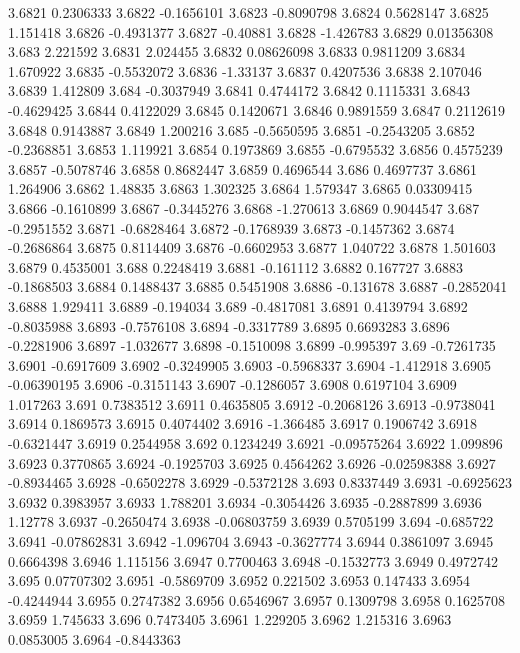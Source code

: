 3.6821  0.2306333
3.6822  -0.1656101
3.6823  -0.8090798
3.6824  0.5628147
3.6825  1.151418
3.6826  -0.4931377
3.6827  -0.40881
3.6828  -1.426783
3.6829  0.01356308
3.683  2.221592
3.6831  2.024455
3.6832  0.08626098
3.6833  0.9811209
3.6834  1.670922
3.6835  -0.5532072
3.6836  -1.33137
3.6837  0.4207536
3.6838  2.107046
3.6839  1.412809
3.684  -0.3037949
3.6841  0.4744172
3.6842  0.1115331
3.6843  -0.4629425
3.6844  0.4122029
3.6845  0.1420671
3.6846  0.9891559
3.6847  0.2112619
3.6848  0.9143887
3.6849  1.200216
3.685  -0.5650595
3.6851  -0.2543205
3.6852  -0.2368851
3.6853  1.119921
3.6854  0.1973869
3.6855  -0.6795532
3.6856  0.4575239
3.6857  -0.5078746
3.6858  0.8682447
3.6859  0.4696544
3.686  0.4697737
3.6861  1.264906
3.6862  1.48835
3.6863  1.302325
3.6864  1.579347
3.6865  0.03309415
3.6866  -0.1610899
3.6867  -0.3445276
3.6868  -1.270613
3.6869  0.9044547
3.687  -0.2951552
3.6871  -0.6828464
3.6872  -0.1768939
3.6873  -0.1457362
3.6874  -0.2686864
3.6875  0.8114409
3.6876  -0.6602953
3.6877  1.040722
3.6878  1.501603
3.6879  0.4535001
3.688  0.2248419
3.6881  -0.161112
3.6882  0.167727
3.6883  -0.1868503
3.6884  0.1488437
3.6885  0.5451908
3.6886  -0.131678
3.6887  -0.2852041
3.6888  1.929411
3.6889  -0.194034
3.689  -0.4817081
3.6891  0.4139794
3.6892  -0.8035988
3.6893  -0.7576108
3.6894  -0.3317789
3.6895  0.6693283
3.6896  -0.2281906
3.6897  -1.032677
3.6898  -0.1510098
3.6899  -0.995397
3.69  -0.7261735
3.6901  -0.6917609
3.6902  -0.3249905
3.6903  -0.5968337
3.6904  -1.412918
3.6905  -0.06390195
3.6906  -0.3151143
3.6907  -0.1286057
3.6908  0.6197104
3.6909  1.017263
3.691  0.7383512
3.6911  0.4635805
3.6912  -0.2068126
3.6913  -0.9738041
3.6914  0.1869573
3.6915  0.4074402
3.6916  -1.366485
3.6917  0.1906742
3.6918  -0.6321447
3.6919  0.2544958
3.692  0.1234249
3.6921  -0.09575264
3.6922  1.099896
3.6923  0.3770865
3.6924  -0.1925703
3.6925  0.4564262
3.6926  -0.02598388
3.6927  -0.8934465
3.6928  -0.6502278
3.6929  -0.5372128
3.693  0.8337449
3.6931  -0.6925623
3.6932  0.3983957
3.6933  1.788201
3.6934  -0.3054426
3.6935  -0.2887899
3.6936  1.12778
3.6937  -0.2650474
3.6938  -0.06803759
3.6939  0.5705199
3.694  -0.685722
3.6941  -0.07862831
3.6942  -1.096704
3.6943  -0.3627774
3.6944  0.3861097
3.6945  0.6664398
3.6946  1.115156
3.6947  0.7700463
3.6948  -0.1532773
3.6949  0.4972742
3.695  0.07707302
3.6951  -0.5869709
3.6952  0.221502
3.6953  0.147433
3.6954  -0.4244944
3.6955  0.2747382
3.6956  0.6546967
3.6957  0.1309798
3.6958  0.1625708
3.6959  1.745633
3.696  0.7473405
3.6961  1.229205
3.6962  1.215316
3.6963  0.0853005
3.6964  -0.8443363
